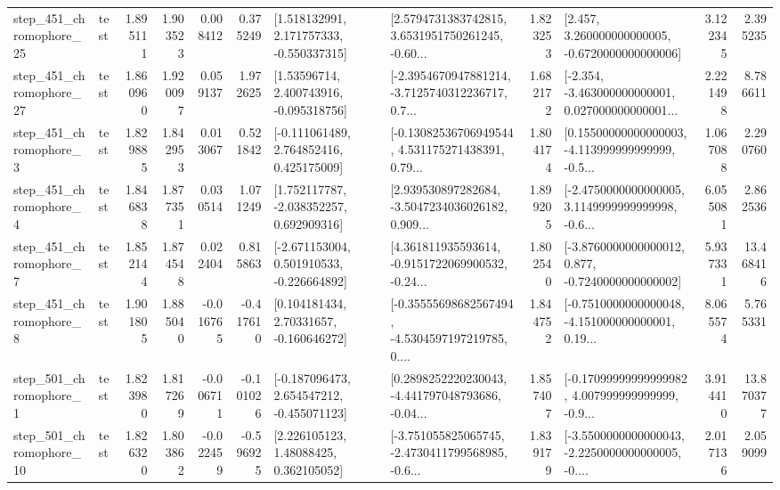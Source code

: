 \begin{tabular}{llrrrrllrlrr}
  step\_451\_chromophore\_25 &      test &      1.895111 &    1.903523 &      0.008412 &  0.375249 &    [1.518132991, 2.171757333, -0.550337315] &  [2.5794731383742815, 3.6531951750261245, -0.60... &       1.823253 &    [2.457, 3.260000000000005, -0.6720000000000006] &            3.122345 &          2.395235 \\
  step\_451\_chromophore\_27 &      test &      1.860960 &    1.920097 &      0.059137 &  1.972625 &     [1.53596714, 2.400743916, -0.095318756] &  [-2.3954670947881214, -3.7125740312236717, 0.7... &       1.682172 &  [-2.354, -3.463000000000001, 0.027000000000001... &            2.221498 &          8.786611 \\
   step\_451\_chromophore\_3 &      test &      1.829885 &    1.842953 &      0.013067 &  0.521842 &    [-0.111061489, 2.764852416, 0.425175009] &  [-0.13082536706949544, 4.531175271438391, 0.79... &       1.804174 &  [0.15500000000000003, -4.113999999999999, -0.5... &            1.067088 &          2.290760 \\
   step\_451\_chromophore\_4 &      test &      1.846838 &    1.877351 &      0.030514 &  1.071249 &    [1.752117787, -2.038352257, 0.692909316] &  [2.939530897282684, -3.5047234036026182, 0.909... &       1.899205 &  [-2.4750000000000005, 3.1149999999999998, -0.6... &            6.055081 &          2.862536 \\
   step\_451\_chromophore\_7 &      test &      1.852144 &    1.874548 &      0.022404 &  0.815863 &   [-2.671153004, 0.501910533, -0.226664892] &  [4.361811935593614, -0.9151722069900532, -0.24... &       1.802540 &  [-3.8760000000000012, 0.877, -0.7240000000000002] &            5.937331 &         13.468416 \\
   step\_451\_chromophore\_8 &      test &      1.901805 &    1.885040 &     -0.016765 & -0.417610 &     [0.104181434, 2.70331657, -0.160646272] &  [-0.35555698682567494, -4.5304597197219785, 0.... &       1.844752 &  [-0.7510000000000048, -4.151000000000001, 0.19... &            8.065574 &          5.765331 \\
   step\_501\_chromophore\_1 &      test &      1.823980 &    1.817269 &     -0.006711 & -0.101026 &   [-0.187096473, 2.654547212, -0.455071123] &  [0.2898252220230043, -4.441797048793686, -0.04... &       1.857407 &  [-0.17099999999999982, 4.007999999999999, -0.9... &            3.914410 &         13.870377 \\
  step\_501\_chromophore\_10 &      test &      1.826320 &    1.803862 &     -0.022459 & -0.596925 &      [2.226105123, 1.48088425, 0.362105052] &  [-3.751055825065745, -2.4730411799568985, -0.6... &       1.839179 &  [-3.5500000000000043, -2.2250000000000005, -0.... &            2.017136 &          2.059099 \\

\end{tabular}
